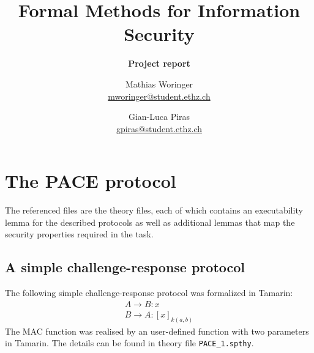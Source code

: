\documentclass[a4paper,11pt]{scrartcl}
\title{Formal Methods for Information Security}
\author{Mathias Woringer \\ \href{mailto:mworinger@student.ethz.ch} {mworinger@student.ethz.ch}
\and Gian-Luca Piras \\ \href{mailto:gpiras@student.ethz.ch}{gpiras@student.ethz.ch}}
\subtitle{\textbf{Project report}}
\begin{document}
\maketitle

\section{The PACE protocol}
The  referenced files are the theory files, each of which contains an executability lemma for the described protocols as well as additional lemmas that map the security properties required in the task.
\subsection{A simple challenge-response protocol}
The following simple challenge-response protocol was formalized in Tamarin:
\begin{align*}
  A \rightarrow B: x\\
  B \rightarrow A: [x]_{k(a,b)}
\end{align*}
The MAC function was realised by an user-defined function with two parameters in Tamarin.  The details can be found in theory file \texttt{PACE_1.spthy}. 
\end{document}
